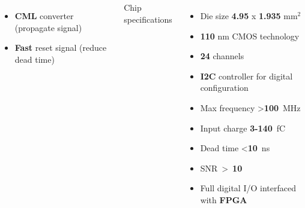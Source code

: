 \documentclass[aspectratio=169]{beamer}
\begin{document}
\begin{frame}
\begin{columns}
\begin{columns}
{\begin{itemize}
				\item \textbf{CML} converter (propagate signal)
				\item \textbf{Fast} reset signal (reduce dead time)
			\end{itemize} }
			{\color{blue} Chip specifications }
			\begin{itemize}
				\item Die size \textbf{4.95 }x \textbf{1.935} mm$^2$
				\item \textbf{110} nm CMOS technology
				\item \textbf{24} channels
				\item \textbf{I2C} controller for digital configuration
				\item Max frequency >\textbf{100}~MHz
				\item Input charge \textbf{3-140}~fC
				\item Dead time <\textbf{10}~ns
				\item SNR~>~\textbf{10}
				\item Full digital I/O interfaced \\ with \textbf{FPGA}
			\end{itemize}
		\end{columns}
	\end{columns}
	\end{frame}

		
\end{document}
